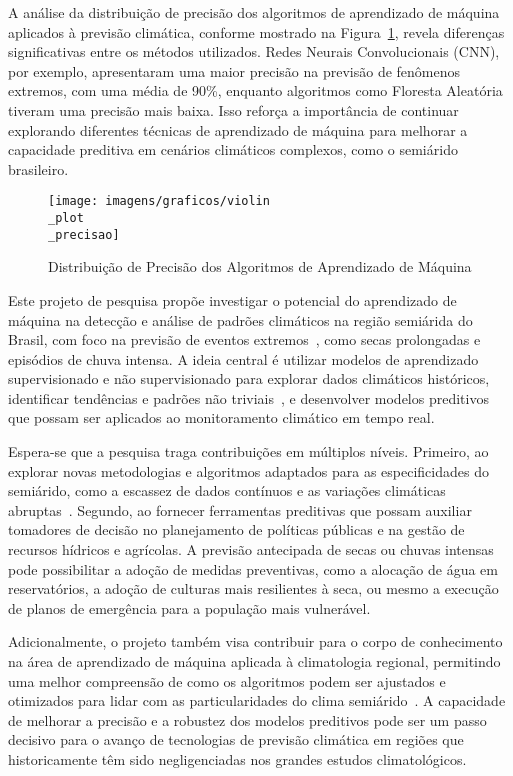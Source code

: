 \documentclass{projetodepesquisa} %
\begin{document}
	A análise da distribuição de precisão dos algoritmos de aprendizado de máquina aplicados à previsão climática, conforme mostrado na Figura~\ref{fig:violin_plot_precisao}, revela diferenças significativas entre os métodos utilizados. Redes Neurais Convolucionais (CNN), por exemplo, apresentaram uma maior precisão na previsão de fenômenos extremos, com uma média de 90\%, enquanto algoritmos como Floresta Aleatória tiveram uma precisão mais baixa. Isso reforça a importância de continuar explorando diferentes técnicas de aprendizado de máquina para melhorar a capacidade preditiva em cenários climáticos complexos, como o semiárido brasileiro.
	
	\begin{figure}[ht]
		\centering
		\texttt{[image: imagens/graficos/violin\\\_plot\\\_precisao]}
		\caption{Distribuição de Precisão dos Algoritmos de Aprendizado de Máquina}
		\label{fig:violin_plot_precisao}
	\end{figure}
	
	
	Este projeto de pesquisa propõe investigar o potencial do aprendizado de máquina na detecção e análise de padrões climáticos na região semiárida do Brasil, com foco na previsão de eventos extremos~\cite{souza2022}, como secas prolongadas e episódios de chuva intensa. A ideia central é utilizar modelos de aprendizado supervisionado e não supervisionado para explorar dados climáticos históricos, identificar tendências e padrões não triviais~\cite{oliveira2019}, e desenvolver modelos preditivos que possam ser aplicados ao monitoramento climático em tempo real.
	
	Espera-se que a pesquisa traga contribuições em múltiplos níveis. Primeiro, ao explorar novas metodologias e algoritmos adaptados para as especificidades do semiárido, como a escassez de dados contínuos e as variações climáticas abruptas~\cite{campos2023}. Segundo, ao fornecer ferramentas preditivas que possam auxiliar tomadores de decisão no planejamento de políticas públicas e na gestão de recursos hídricos e agrícolas. A previsão antecipada de secas ou chuvas intensas pode possibilitar a adoção de medidas preventivas, como a alocação de água em reservatórios, a adoção de culturas mais resilientes à seca, ou mesmo a execução de planos de emergência para a população mais vulnerável.
	
	Adicionalmente, o projeto também visa contribuir para o corpo de conhecimento na área de aprendizado de máquina aplicada à climatologia regional, permitindo uma melhor compreensão de como os algoritmos podem ser ajustados e otimizados para lidar com as particularidades do clima semiárido~\cite{silva2020}. A capacidade de melhorar a precisão e a robustez dos modelos preditivos pode ser um passo decisivo para o avanço de tecnologias de previsão climática em regiões que historicamente têm sido negligenciadas nos grandes estudos climatológicos.
	
\end{document}
